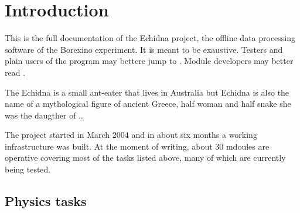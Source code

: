 \chapter{Introduction}
\label{ch:intro}

This is the full documentation of the Echidna project, the offline data processing software of the Borexino experiment.
It is meant to be exaustive.
Testers and plain users of the program may bettere jump to .
Module developers may better read .

The Echidna is a small ant-eater that lives in Australia but Echidna is also the name of a mythological figure of ancient Greece, half woman and half snake she was the daugther of \ldots

The project started in March 2004 and in about six months a working infrastructure was built.
At the moment of writing, about 30 mdoules are operative covering most of the tasks listed above, many of which are currently being tested.

\section{Physics tasks}
\label{sec:intro_tasks}

